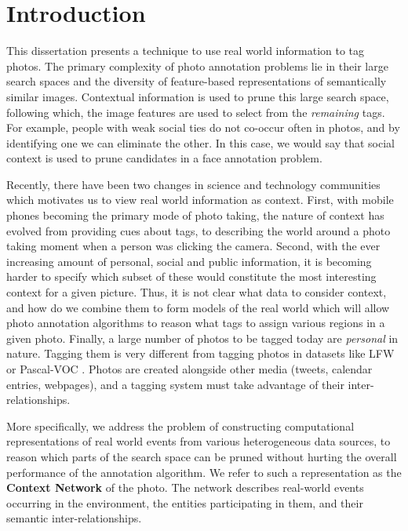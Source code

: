 \chapter{Introduction}

This dissertation presents a technique to use real world information to tag photos. The primary complexity of photo annotation problems lie in their large search spaces and the diversity of feature-based representations of semantically similar images. Contextual information is used to prune this large search space, following which, the image features are used to select from the \textit{remaining} tags. For example, people with weak social ties do not co-occur often in photos, and by identifying one we can eliminate the other. In this case, we would say that social context is used to prune candidates in a face annotation problem.

Recently, there have been two changes in science and technology communities which motivates us to view real world information as context. First, with mobile phones becoming the primary mode of photo taking, the nature of context has evolved from providing cues about tags, to describing the world around a photo taking moment when a person was clicking the camera. Second, with the ever increasing amount of personal, social and public information, it is becoming harder to specify which subset of these would constitute the most interesting context for a given picture. Thus, it is not clear what data to consider context, and how do we combine them to form models of the real world which will allow photo annotation algorithms to reason what tags to assign various regions in a given photo. Finally, a large number of photos to be tagged today are \textit{personal} in nature. Tagging them is very different from tagging photos in datasets like LFW or Pascal-VOC \cite{huang2008labeled, everingham2010pascal}. Photos are created alongside other media (tweets, calendar entries, webpages), and a tagging system must take advantage of their inter-relationships.

More specifically, we address the problem of constructing computational representations of real world events from various heterogeneous data sources, to reason which parts of the search space can be pruned without hurting the overall performance of the annotation algorithm. We refer to such a representation as the \textbf{Context Network} of the photo. The network describes real-world events occurring in the environment, the entities participating in them, and their semantic inter-relationships.

